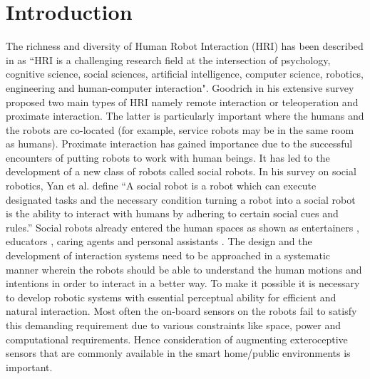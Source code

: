 \documentclass{llncs}
\begin{document}
\section{Introduction}
The richness and diversity of Human Robot Interaction (HRI) has been described in \cite{Dautenhahn2007} as ``HRI is a challenging research field at the intersection of psychology, cognitive science, social sciences, artificial intelligence, computer science, robotics, engineering and human-computer interaction". Goodrich \cite{Goodrich:2007:HIS:1348099.1348100} in his extensive survey proposed two main types of HRI namely remote interaction or teleoperation and proximate interaction. The latter is particularly important where the humans and the robots are co-located (for example, service robots may be in the same room as humans). Proximate interaction has gained importance due to the successful encounters of putting robots to work with human beings. It has led to the development of a new class of robots called social robots. In his survey on social robotics, Yan et al. \cite{Yan2014} define ``A social robot is a robot which can execute designated tasks and the necessary condition turning a robot into a social robot is the ability to interact with humans by adhering to certain social cues and rules.''
	Social robots already entered the human spaces as shown as entertainers \cite{NaoTheRobot}, educators \cite{NaoTheRobot}, caring agents \cite{ASKNao} and personal assistants \cite{ProjectRomeo}\cite{PepperTheRobot}. The design and the development of interaction systems need to be approached in a systematic manner wherein the robots should be able to understand the human motions and intentions in order to interact in a better way. To make it possible it is necessary to develop robotic systems with essential perceptual ability for efficient and natural interaction. Most often the on-board sensors on the robots fail to satisfy this demanding requirement due to various constraints like space, power and computational requirements. Hence consideration of augmenting exteroceptive sensors that are commonly available in the smart home/public environments is important.
	
\end{document}
